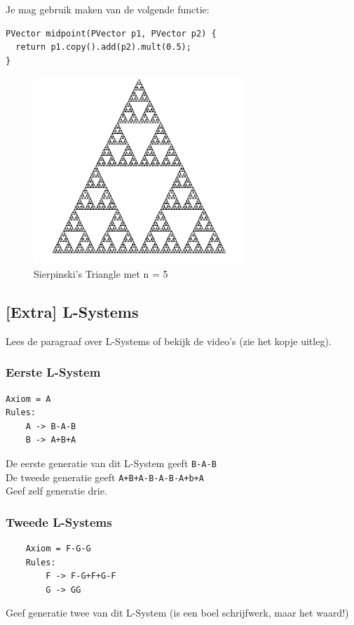 \documentclass{../qh_exercise}
\begin{document}
Je mag gebruik maken van de volgende functie:
\begin{lstlisting}
PVector midpoint(PVector p1, PVector p2) {
  return p1.copy().add(p2).mult(0.5);
}
\end{lstlisting}

\begin{figure}[H]
	\centering
	\includegraphics[width=8cm]{sierpinski.png}
	\caption{Sierpinski's Triangle met n = 5}
	\label{fig:sierpinski}
\end{figure}

\newpage
\subsection{[Extra] L-Systems}
Lees de paragraaf over L-Systems of bekijk de video's (zie het kopje uitleg). 
\subsubsection{Eerste L-System}
\begin{verbatim}
Axiom = A
Rules:
    A -> B-A-B
    B -> A+B+A
\end{verbatim}
De eerste generatie van dit L-System geeft \texttt{B-A-B}\\
De tweede generatie geeft \texttt{A+B+A-B-A-B-A+b+A}\\
Geef zelf generatie drie.

\subsubsection{Tweede L-Systems}
\begin{verbatim}
    Axiom = F-G-G
    Rules:
        F -> F-G+F+G-F
        G -> GG
\end{verbatim}
Geef generatie twee van dit L-System (is een boel schrijfwerk, maar het waard!)
\end{document}
